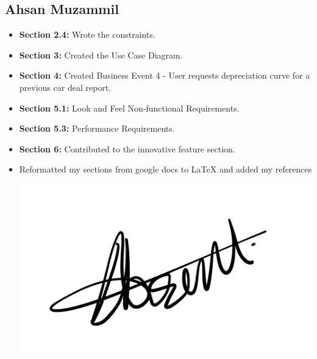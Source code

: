 \documentclass[]{article}
\begin{document}
\subsection{Ahsan Muzammil}
\begin{itemize}
    \item \textbf{Section 2.4:} Wrote the constraints.
    \item \textbf{Section 3:} Created the Use Case Diagram.
    \item \textbf{Section 4:} Created Business Event 4 - User requests depreciation curve for a previous car deal report.
    \item \textbf{Section 5.1:} Look and Feel Non-functional Requirements.
    \item \textbf{Section 5.3:} Performance Requirements.
    \item \textbf{Section 6:} Contributed to the innovative feature section.
    \item Reformatted my sections from google docs to LaTeX and added my references
    \begin{center}
        \includegraphics[scale=0.1]{Images/ahsan.jpeg}
    \end{center}
\end{itemize}
\end{document}
